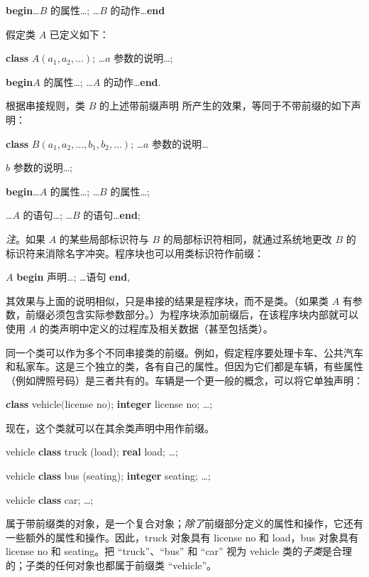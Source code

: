 \documentclass[twoside,11pt,fontset=none]{ctexbook}
\begin{document}
\quad\quad \textbf{begin}\dots $B$ 的属性\dots; \dots $B$ 的动作\dots \textbf{end}

\noindent
假定类 $A$ 已定义如下：

\quad \textbf{class} $A(a_1, a_2 , \dots)$; \dots $a$ 参数的说明\dots;

\quad \quad \textbf{begin}\quad $A$ 的属性\dots; \dots $A$ 的动作\dots \textbf{end}.

根据串接规则，类 $B$ 的上述带前缀声明
所产生的效果，等同于不带前缀的如下声明：

\quad \textbf{class} $B(a_1, a_2, \dots, b_1, b_2, \dots)$; \dots $a$ 参数的说明\dots

\quad \quad \quad $b$ 参数的说明\dots;

\quad \quad \textbf{begin}\dots $A$ 的属性\dots; \dots $B$ 的属性\dots;

\tabto*{5.9em}\dots $A$ 的语句\dots; \dots $B$ 的语句\dots \textbf{end};

\textit{注}。如果 $A$ 的某些局部标识符与 $B$ 的局部标识符相同，就通过系统地更改 $B$ 的标识符来消除名字冲突。程序块也可以用类标识符作前缀：

\quad $A$ \textbf{begin} 声明\dots; \dots 语句 \textbf{end},

\noindent
其效果与上面的说明相似，只是串接的结果是程序块，而不是类。（如果类 $A$ 有参数，前缀必须包含实际参数部分。）为程序块添加前缀后，在该程序块内部就可以使用 $A$ 的类声明中定义的过程库及相关数据（甚至包括类）。

同一个类可以作为多个不同串接类的前缀。例如，假定程序要处理卡车、公共汽车和私家车。这是三个独立的类，各有自己的属性。但因为它们都是车辆，有些属性（例如牌照号码）是三者共有的。车辆是一个更一般的概念，可以将它单独声明：

\quad \textbf{class} vehicle$($license no$)$; \textbf{integer} license no; \dots;

\noindent
现在，这个类就可以在其余类声明中用作前缀。

\quad vehicle \textbf{class} truck (load); \textbf{real} load; \dots;

\quad vehicle \textbf{class} bus (seating); \textbf{integer} seating; \dots;

\quad vehicle \textbf{class} car; \dots;

属于带前缀类的对象，是一个复合对象；\textit{除了}前缀部分定义的属性和操作，它还有一些额外的属性和操作。因此，truck 对象具有 license no 和 load，bus 对象具有 license no 和 seating。把 ``truck''、``bus'' 和 ``car'' 视为 vehicle 类的\textit{子类}是合理的；子类的任何对象也都属于前缀类 ``vehicle''。
\end{document}
